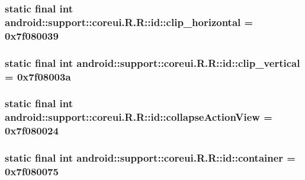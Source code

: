 \hypertarget{classandroid_1_1support_1_1coreui_1_1_r_1_1id_a529df1b1d9f2b0e31a70406fc2135c0}{
\subsubsection[{clip\_\-horizontal}]{\setlength{\rightskip}{0pt plus 5cm}static final int android::support::coreui.R.R::id::clip\_\-horizontal = 0x7f080039}}
\label{classandroid_1_1support_1_1coreui_1_1_r_1_1id_a529df1b1d9f2b0e31a70406fc2135c0}


\hypertarget{classandroid_1_1support_1_1coreui_1_1_r_1_1id_85d979c1c8c32d4b523853a3a92091d7}{
\subsubsection[{clip\_\-vertical}]{\setlength{\rightskip}{0pt plus 5cm}static final int android::support::coreui.R.R::id::clip\_\-vertical = 0x7f08003a}}
\label{classandroid_1_1support_1_1coreui_1_1_r_1_1id_85d979c1c8c32d4b523853a3a92091d7}


\hypertarget{classandroid_1_1support_1_1coreui_1_1_r_1_1id_ff3e9541d554297439c10f759899444b}{
\subsubsection[{collapseActionView}]{\setlength{\rightskip}{0pt plus 5cm}static final int android::support::coreui.R.R::id::collapseActionView = 0x7f080024}}
\label{classandroid_1_1support_1_1coreui_1_1_r_1_1id_ff3e9541d554297439c10f759899444b}


\hypertarget{classandroid_1_1support_1_1coreui_1_1_r_1_1id_f293827ec8d1c2a9038e262c4739b2d0}{
\subsubsection[{container}]{\setlength{\rightskip}{0pt plus 5cm}static final int android::support::coreui.R.R::id::container = 0x7f080075}}
\label{classandroid_1_1support_1_1coreui_1_1_r_1_1id_f293827ec8d1c2a9038e262c4739b2d0}


